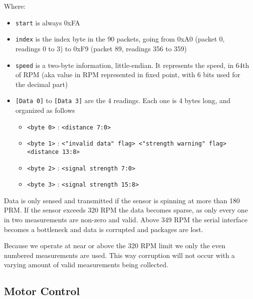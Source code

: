 \documentclass[Main]{subfiles}
\begin{document}
			Where:
			\vspace{-12pt}
			\begin{itemize}
				\item \texttt{start} is always 0xFA

				\item \texttt{index} is the index byte in the 90 packets, going from 0xA0 (packet 0, readings 0 to 3) to 0xF9 (packet 89, readings 356 to 359)

				\item \texttt{speed} is a two-byte information, little-endian. It represents the speed, in 64th of RPM (aka value in RPM represented in fixed point, with 6 bits used for the decimal part)

				\item \texttt{[Data 0]} to \texttt{[Data 3]} are the 4 readings. Each one is 4 bytes long, and organized as follows 
				\begin{itemize}
					\item \texttt{<byte 0>} : \texttt{<distance 7:0>}

					\item \texttt{<byte 1>} : \texttt{<"invalid data" flag> <"strength warning" flag> <distance 13:8>}

					\item \texttt{<byte 2>} : \texttt{<signal strength 7:0>}

					\item \texttt{<byte 3>} : \texttt{<signal strength 15:8>}
				\end{itemize}
			\end{itemize}

			Data is only sensed and transmitted if the sensor is spinning at more than 180 PRM.
			If the sensor exceeds 320 RPM the data becomes sparse, as only every one in two measurements are non-zero and valid.
			Above 349 RPM the serial interface becomes a bottleneck and data is corrupted and packages are lost.

			Because we operate at near or above the 320 RPM limit we only the even numbered measurements are used.
			This way corruption will not occur with a varying amount of valid measurements being collected.

	

	\subsection{Motor Control} %
	\label{sub:motor_control}
\end{document}
